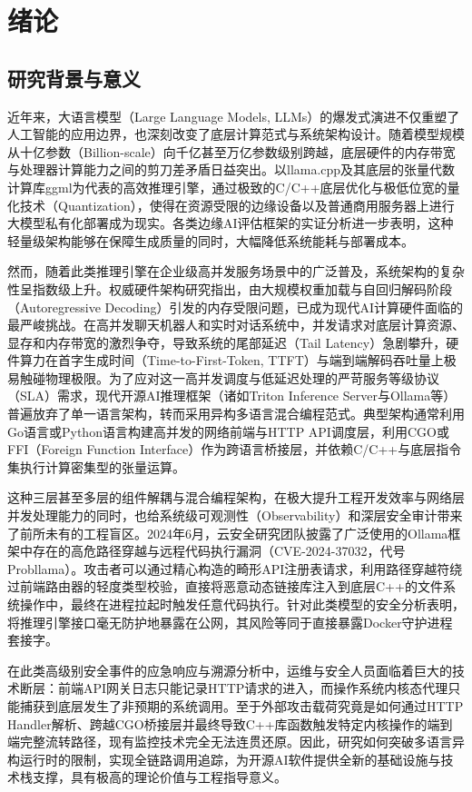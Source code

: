 
\chapter{绪论}
\label{chap:intro}

\section{研究背景与意义}

近年来，大语言模型（Large Language Models, LLMs）的爆发式演进不仅重塑了人工智能的应用边界，也深刻改变了底层计算范式与系统架构设计。随着模型规模从十亿参数（Billion-scale）向千亿甚至万亿参数级别跨越，底层硬件的内存带宽与处理器计算能力之间的剪刀差矛盾日益突出。以llama.cpp及其底层的张量代数计算库ggml为代表的高效推理引擎，通过极致的C/C++底层优化与极低位宽的量化技术（Quantization），使得在资源受限的边缘设备以及普通商用服务器上进行大模型私有化部署成为现实。各类边缘AI评估框架的实证分析进一步表明，这种轻量级架构能够在保障生成质量的同时，大幅降低系统能耗与部署成本。

然而，随着此类推理引擎在企业级高并发服务场景中的广泛普及，系统架构的复杂性呈指数级上升。权威硬件架构研究指出，由大规模权重加载与自回归解码阶段（Autoregressive Decoding）引发的内存受限问题，已成为现代AI计算硬件面临的最严峻挑战。在高并发聊天机器人和实时对话系统中，并发请求对底层计算资源、显存和内存带宽的激烈争夺，导致系统的尾部延迟（Tail Latency）急剧攀升，硬件算力在首字生成时间（Time-to-First-Token, TTFT）与端到端解码吞吐量上极易触碰物理极限。为了应对这一高并发调度与低延迟处理的严苛服务等级协议（SLA）需求，现代开源AI推理框架（诸如Triton Inference Server与Ollama等）普遍放弃了单一语言架构，转而采用异构多语言混合编程范式。典型架构通常利用Go语言或Python语言构建高并发的网络前端与HTTP API调度层，利用CGO或FFI（Foreign Function Interface）作为跨语言桥接层，并依赖C/C++与底层指令集执行计算密集型的张量运算。

这种三层甚至多层的组件解耦与混合编程架构，在极大提升工程开发效率与网络层并发处理能力的同时，也给系统级可观测性（Observability）和深层安全审计带来了前所未有的工程盲区。2024年6月，云安全研究团队披露了广泛使用的Ollama框架中存在的高危路径穿越与远程代码执行漏洞（CVE-2024-37032，代号Probllama）。攻击者可以通过精心构造的畸形API注册表请求，利用路径穿越符绕过前端路由器的轻度类型校验，直接将恶意动态链接库注入到底层C++的文件系统操作中，最终在进程拉起时触发任意代码执行。针对此类模型的安全分析表明，将推理引擎接口毫无防护地暴露在公网，其风险等同于直接暴露Docker守护进程套接字。

在此类高级别安全事件的应急响应与溯源分析中，运维与安全人员面临着巨大的技术断层：前端API网关日志只能记录HTTP请求的进入，而操作系统内核态代理只能捕获到底层发生了非预期的系统调用。至于外部攻击载荷究竟是如何通过HTTP Handler解析、跨越CGO桥接层并最终导致C++库函数触发特定内核操作的端到端完整流转路径，现有监控技术完全无法连贯还原。因此，研究如何突破多语言异构运行时的限制，实现全链路调用追踪，为开源AI软件提供全新的基础设施与技术栈支撑，具有极高的理论价值与工程指导意义。

